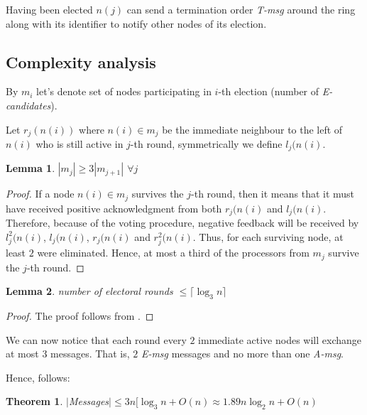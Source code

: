 \documentclass{article}
\newtheorem{lemma}{Lemma}
\newtheorem{theorem}{Theorem}
\begin{document}
Having been elected $n(j)$ can send a termination order \textit{T-msg} around the ring along with its identifier to notify other nodes of its election.
\subsection*{Complexity analysis}
By $m_i$ let's denote set of nodes participating in $i$-th election (number of \textit{E-candidates}).

Let $r_j(n(i))$ where $n(i)\in m_j$ be the immediate neighbour to the left of $n(i)$ who is still active in $j$-th round, symmetrically we define $l_j(n(i)$.
\begin{lemma}\label{lemma1}
    $|m_j|\geq 3|m_{j+1}|$ $\forall j$
\end{lemma}
\begin{proof}
If a node $n(i)\in m_j$ survives the $j$-th round, then it means that it must have received positive acknowledgment from both $r_j(n(i)$ and $l_j(n(i)$.
Therefore, because of the voting procedure, negative feedback will be received by $l^{2}_{j}(n(i)$, $l_{j}(n(i)$, $r_{j}(n(i)$ and $r^{2}_{j}(n(i)$. Thus, for each surviving node, at least $2$ were eliminated. 
Hence, at most a third of the processors from $m_j$ survive the $j$-th round.
\end{proof}
\begin{lemma}\label{lemma2}
    number of electoral rounds $\leq \lceil\log_{3}n\rceil$
\end{lemma}
\begin{proof}
The proof follows from .
\end{proof}

We can now notice that each round every $2$ immediate active nodes will exchange at most $3$ messages. That is, $2$ \textit{E-msg} messages and no more than one \textit{A-msg}.

Hence, follows:
\begin{theorem}
$|$Messages$|\leq 3n[\log_{3}n+O(n)\approx 1.89n \log_{2}n+O(n)$
\end{theorem}

 
\end{document}
